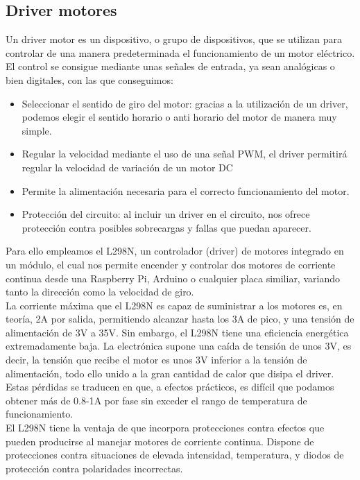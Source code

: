 \subsection{Driver motores}

Un driver motor es un dispositivo, o grupo de dispositivos, que se utilizan para controlar de una manera predeterminada el funcionamiento de un motor eléctrico. El control 
se consigue mediante unas señales de entrada, ya sean analógicas o bien digitales, con las que 
conseguimos:

\begin{itemize}
 \item Seleccionar el sentido de giro del motor: gracias a la utilización de un driver, podemos 
elegir el sentido horario o anti horario del motor de manera muy simple.
\item Regular la velocidad mediante el uso de una señal PWM, el driver permitirá regular la velocidad de variación de un motor DC
\item Permite la alimentación necesaria para el correcto funcionamiento del motor.
\item Protección del circuito: al incluir un driver en el circuito, nos ofrece protección contra 
posibles sobrecargas y fallas que puedan aparecer.
\end{itemize}

Para ello empleamos el L298N, un controlador (driver) de motores integrado en un módulo, el cual nos permite encender y controlar dos motores de corriente continua desde una Raspberry Pi, Arduino o
cualquier placa similiar, variando tanto la dirección como la velocidad de giro.\\

La corriente máxima que el L298N es capaz de suministrar a los motores es, en teoría, 2A por salida, permitiendo alcanzar hasta los 3A de pico, y una tensión de alimentación de 3V
a 35V. Sin embargo, el L298N tiene una eficiencia energética extremadamente baja. La electrónica supone una caída de tensión de unos 3V, es decir, la tensión que recibe el motor
es unos 3V inferior a la tensión de alimentación, todo ello unido a la gran cantidad de calor que disipa el driver.\\

Estas pérdidas se traducen en que, a efectos prácticos, es difícil que podamos obtener más de 0.8-1A por fase sin exceder el rango de temperatura de funcionamiento.\\

El L298N tiene la ventaja de que incorpora protecciones contra efectos que pueden producirse al manejar motores de corriente continua. Dispone de protecciones contra situaciones
de elevada intensidad, temperatura, y diodos de protección contra polaridades incorrectas.\\

